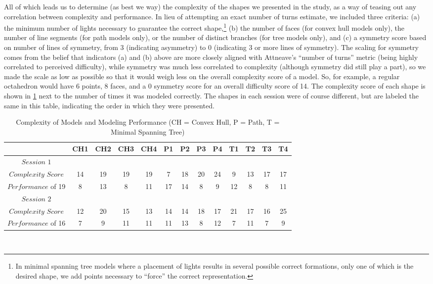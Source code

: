 All of which leads us to determine (as best we way) the complexity of the shapes
we presented in the study, as a way of teasing out any correlation between
complexity and performance. In lieu of attempting an exact number of turns
estimate, we included three criteria: (a) the minimum number of lights necessary
to guarantee the correct shape,\footnote{In minimal spanning tree models where a
placement of lights results in several possible correct formations, only one of
which is the desired shape, we add points necessary to ``force'' the correct
representation.} (b) the number of faces (for convex hull models only), the
number of line segments (for path models only), or the number of distinct
branches (for tree models only), and (c) a symmetry score based on number of
lines of symmetry, from 3 (indicating asymmetry) to 0 (indicating 3 or more
lines of symmetry). The scaling for symmetry comes from the belief that
indicators (a) and (b) above are more closely aligned with Attneave's ``number
of turns'' metric (being highly correlated to perceived difficulty), while
symmetry was much less correlated to complexity (although symmetry did still
play a part), so we made the scale as low as possible so that it would weigh
less on the overall complexity score of a model. So, for example, a regular
octahedron would have 6 points, 8 faces, and a 0 symmetry score for an overall
difficulty score of 14. The complexity score of each shape is shown in
\ref{modelComplexity} next to the number of times it was modeled correctly. The
shapes in each session were of course different, but are labeled the same in
this table, indicating the order in which they were presented.



\begin{table}[!ht] 
\small
    \caption[Complexity of Models and Modeling Performance]{Complexity of Models
    and Modeling Performance (CH = Convex Hull, P = Path, T = Minimal Spanning
    Tree)}
    \begin{center}
    \begin{tabular}{| c | c | c | c | c | c | c | c | c | c | c | c | c | }
    \hline $ $ & CH1 & CH2 & CH3 & CH4 & P1 & P2 & P3 & P4 & T1 & T2 & T3 & T4 \\
   	\hline
   	$Session$ $1$ & & & & & & & & & & & &  \\ \hline
   	$Complexity$ $Score$ & 14 & 19 & 19 & 19 & 7 & 18 & 20 & 24 & 9 & 13 & 17 &
   	17 \\ \hline 
   	$Performance$ of 19 & 8 & 13 & 8 & 11 & 17 & 14 & 8 & 9 & 12 & 8 & 8 & 11 \\
   	\hline 
   	$Session$ $2$ & & & & & & & & & & & & \\ \hline
   	$Complexity$ $Score$ & 12 & 20 & 15 & 13 & 14 & 14 & 18 & 17 & 21 & 17 & 16
   	& 25 \\ \hline 
   	$Performance$ of 16 & 7 & 9 & 11 & 11 & 11 & 13 & 8 & 12 & 7 & 11 & 7 & 9 \\
   	\hline
   	
	\end{tabular}
   \\ \rule{0mm}{5mm}
\end{center}
\label{modelComplexity}
\end{table}


